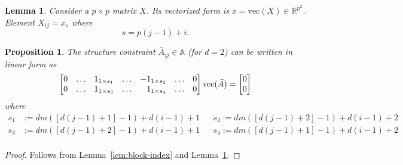 \documentclass[a4paper]{article}
\newtheorem{prop}{Proposition}
\newtheorem{lem}{Lemma}
\begin{document}
\begin{lem}\label{lem:vec-index}
Consider a $p\times p$ matrix $X$.
Its vectorized form is $x=\mathrm{vec}(X)\in\mathbb{R}^{p^2}$.
Element $X_{ij} = x_s$ where
\begin{equation*}
s = p(j-1) + i.
\end{equation*}
\end{lem}

\begin{prop}\label{prop:blockstruct-vec}
The structure constraint $\bar{A}_{ij}\in\mathbb{A}$ (for $d=2$) can be written in linear form as
\begin{equation*}
\begin{bmatrix}
0&\dots&1_{1\times s_1}&\dots&-1_{1\times s_2}&\dots&0 \\
0&\dots&1_{1\times s_3}&\dots&\hphantom{-}1_{1\times s_4}&\dots&0 \\
\end{bmatrix}
\mathrm{vec}(\bar{A}) =
\begin{bmatrix}0\\0\end{bmatrix}
\end{equation*}
where
\begin{align*}
s_1 &:= dm([d(j-1)+1]-1)+d(i-1)+1
&& s_2 := dm([d(j-1)+2]-1)+d(i-1)+2 \\
s_3 &:= dm([d(j-1)+2]-1)+d(i-1)+1
&& s_4 := dm([d(j-1)+1]-1)+d(i-1)+2 \\
\end{align*}
\end{prop}
\begin{proof}
Follows from Lemma~\ref{lem:block-index} and Lemma~\ref{lem:vec-index}.
\end{proof}
\end{document}
